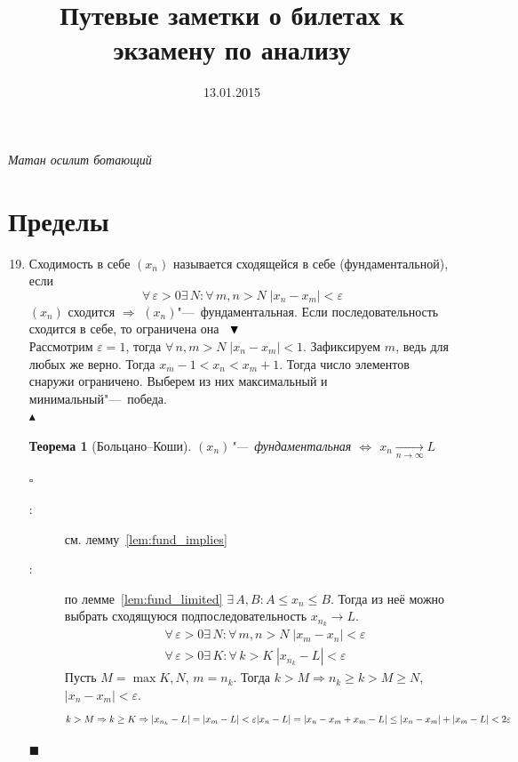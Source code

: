 \documentclass[a4paper,12pt]{article}
\title{Путевые заметки о билетах к экзамену по анализу}
\date{13.01.2015}
\author{}
\theoremstyle{plain}
\newtheorem{thrm}{Теорема}
\theoremstyle{definition}
\theoremstyle{remark}
\newenvironment{ittproof}{$\square$ }{ $\blacksquare$ \\}
\newenvironment{itlproof}{$\phantom{0}\\ \blacktriangledown$ \\ }%
{ \phantom{0}\\ $\blacktriangle$ \\}
\begin{document}
\maketitle
\epigraph{\sl Матан осилит ботающий }{}
\section*{Пределы}
\begin{enumerate}
  \setcounter{enumi}{18}
  \item Сходимость в себе
    {  $(x_n)$ называется сходящейся в себе (фундаментальной), если
      \[
        \forall\,\varepsilon>0 \exists\,N:\forall\,m,n > N\; |x_n - x_m| < \varepsilon 
      \] 
    }
    { \lem\label{lem:fund_implies} $(x_n)$ сходится $\Rightarrow$ $(x_n)$"---~фундаментальная. }
    { \lem\label{lem:fund_limited} Если последовательность сходится в себе, то ограничена она }
    \begin{itlproof}
      Рассмотрим $\varepsilon=1$, тогда $\forall\, n,m > N\; |x_n - x_m| < 1$.
      Зафиксируем $m$, ведь для любых же верно.
      Тогда $x_m-1 < x_n < x_m + 1$. Тогда число элементов снаружи ограничено.
      Выберем из них максимальный и минимальный"---~победа.
    \end{itlproof}
    \begin{thrm}[Больцано--Коши]
      $(x_n)$"---~фундаментальная $\Leftrightarrow$ $x_n\xrightarrow[n\to\infty]{} L$
    \end{thrm}
    \begin{ittproof}
      \begin{description}
        \item[\fbox{$\Leftarrow$} :]  см. лемму~\ref{lem:fund_implies}
        \item[\fbox{$\Rightarrow$} :] по лемме~\ref{lem:fund_limited} $\exists\,A,B:A\leq x_n\leq B$.
          Тогда из неё можно выбрать сходящуюся подпоследовательность $x_{n_k}\to L$.
          \begin{align*}
            &\forall\,\varepsilon>0 \exists\,N : \forall\, m,n > N \; |x_m-x_n| < \varepsilon \\
            &\forall\,\varepsilon>0 \exists\,K : \forall\, k > K \; |x_{n_k} - L| < \varepsilon 
          \end{align*}
          Пусть $M = \max{K,N}$, $m = n_k$. 
          Тогда $k > M \Rightarrow n_k \geq k > M \geq N$, $|x_n - x_m| < \varepsilon$.
          \[
            k > M \Rightarrow k \geq K \Rightarrow |x_{n_k} - L | = |x_m - L| < \varepsilon \\
            |x_n - L| = |x_n - x_m + x_m - L| \leq |x_n - x_m | + |x_m - L| < 2\varepsilon 
          \]
      \end{description}
    \end{ittproof}
\end{enumerate}
\end{document}
